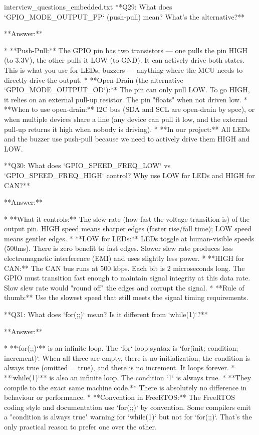 \begin{filecontents*}{interview_questions_embedded.txt}
**Q29: What does `GPIO_MODE_OUTPUT_PP` (push-pull) mean? What's the alternative?**

**Answer:**

* **Push-Pull:** The GPIO pin has two transistors — one pulls the pin HIGH (to 3.3V), the other pulls it LOW (to GND). It can actively drive both states. This is what you use for LEDs, buzzers — anything where the MCU needs to directly drive the output.
* **Open-Drain (the alternative `GPIO_MODE_OUTPUT_OD`):** The pin can only pull LOW. To go HIGH, it relies on an external pull-up resistor. The pin "floats" when not driven low.
* **When to use open-drain:** I2C bus (SDA and SCL are open-drain by spec), or when multiple devices share a line (any device can pull it low, and the external pull-up returns it high when nobody is driving).
* **In our project:** All LEDs and the buzzer use push-pull because we need to actively drive them HIGH and LOW.

**Q30: What does `GPIO_SPEED_FREQ_LOW` vs `GPIO_SPEED_FREQ_HIGH` control? Why use LOW for LEDs and HIGH for CAN?**

**Answer:**

* **What it controls:** The slew rate (how fast the voltage transition is) of the output pin. HIGH speed means sharper edges (faster rise/fall time); LOW speed means gentler edges.
* **LOW for LEDs:** LEDs toggle at human-visible speeds (500ms). There is zero benefit to fast edges. Slower slew rate produces less electromagnetic interference (EMI) and uses slightly less power.
* **HIGH for CAN:** The CAN bus runs at 500 kbps. Each bit is 2 microseconds long. The GPIO must transition fast enough to maintain signal integrity at this data rate. Slow slew rate would "round off" the edges and corrupt the signal.
* **Rule of thumb:** Use the slowest speed that still meets the signal timing requirements.

**Q31: What does `for(;;)` mean? Is it different from `while(1)`?**

**Answer:**

* **`for(;;)`** is an infinite loop. The `for` loop syntax is `for(init; condition; increment)`. When all three are empty, there is no initialization, the condition is always true (omitted = true), and there is no increment. It loops forever.
* **`while(1)`** is also an infinite loop. The condition `1` is always true.
* **They compile to the exact same machine code.** There is absolutely no difference in behaviour or performance.
* **Convention in FreeRTOS:** The FreeRTOS coding style and documentation use `for(;;)` by convention. Some compilers emit a "condition is always true" warning for `while(1)` but not for `for(;;)`. That's the only practical reason to prefer one over the other.


\end{filecontents*}
